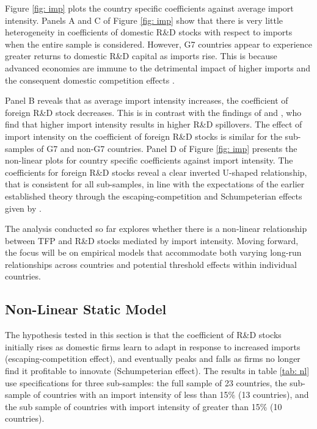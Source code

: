 \documentclass[12pt]{article}
\begin{document}
Figure \ref{fig: imp} plots the country specific coefficients against average import intensity. Panels A and C of Figure \ref{fig: imp} show that there is very little heterogeneity in coefficients of domestic R\&D stocks with respect to imports when the entire sample is considered. However, G7 countries appear to experience greater returns to domestic R\&D capital as imports rise. This is because advanced economies are immune to the detrimental impact of higher imports and the consequent domestic competition effects \citep{Aghion2005}. 

Panel B reveals that as average import intensity increases, the coefficient of foreign R\&D stock decreases. This is in contrast with the findings of \citet{Lichtenberg1998} and \citet{Coe2009}, who find that higher import intensity results in higher R\&D spillovers. The effect of import intensity on the coefficient of foreign R\&D stocks is similar for the sub-samples of G7 and non-G7 countries. Panel D of Figure \ref{fig: imp} presents the non-linear plots for country specific coefficients against import intensity. The coefficients for foreign R\&D stocks reveal a clear inverted U-shaped relationship, that is consistent for all sub-samples, in line with the expectations of the earlier established theory through the escaping-competition and Schumpeterian effects given by \citet{Aghion2005}. 

The analysis conducted so far explores whether there is a non-linear relationship between TFP and R\&D stocks mediated by import intensity. Moving forward, the focus will be on empirical models that accommodate both varying long-run relationships across countries and potential threshold effects within individual countries.

\subsection{Non-Linear Static Model}

The hypothesis tested in this section is that the coefficient of R\&D stocks initially rises as domestic firms learn to adapt in response to increased imports (escaping-competition effect), and eventually peaks and falls as firms no longer find it profitable to innovate (Schumpeterian effect). The results in table \ref{tab: nl} use specifications for three sub-samples: the full sample of 23 countries, the sub-sample of countries with an import intensity of less than 15\% (13 countries), and the sub sample of countries with import intensity of greater than 15\% (10 countries).
\end{document}
